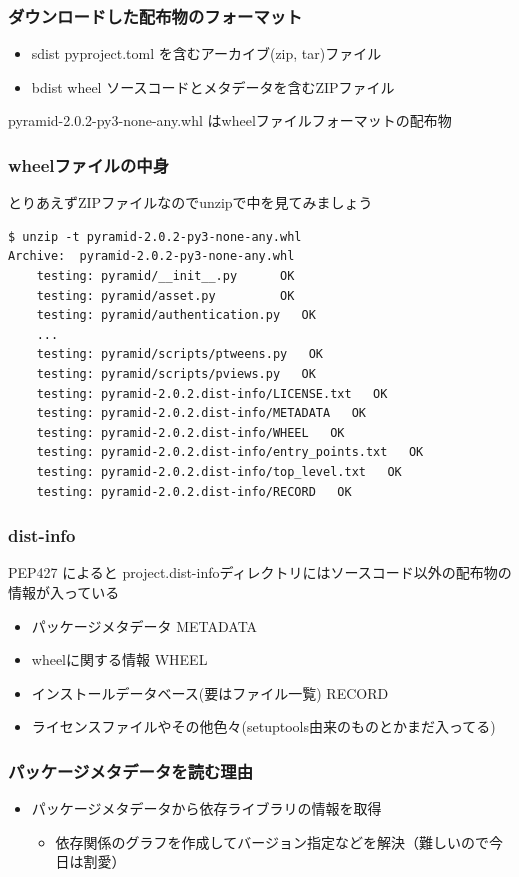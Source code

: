 \documentclass[aspectratio=169]{beamer}
\begin{document}
\begin{frame}
\frametitle{ダウンロードした配布物のフォーマット}
\begin{itemize}
\item sdist pyproject.toml を含むアーカイブ(zip, tar)ファイル
\item bdist wheel ソースコードとメタデータを含むZIPファイル
\end{itemize}

pyramid-2.0.2-py3-none-any.whl はwheelファイルフォーマットの配布物
\end{frame}

\begin{frame}[fragile]
\frametitle{wheelファイルの中身}
とりあえずZIPファイルなのでunzipで中を見てみましょう
\begin{lstlisting}
$ unzip -t pyramid-2.0.2-py3-none-any.whl
Archive:  pyramid-2.0.2-py3-none-any.whl
    testing: pyramid/__init__.py      OK
    testing: pyramid/asset.py         OK
    testing: pyramid/authentication.py   OK
	...
    testing: pyramid/scripts/ptweens.py   OK
    testing: pyramid/scripts/pviews.py   OK
    testing: pyramid-2.0.2.dist-info/LICENSE.txt   OK
    testing: pyramid-2.0.2.dist-info/METADATA   OK
    testing: pyramid-2.0.2.dist-info/WHEEL   OK
    testing: pyramid-2.0.2.dist-info/entry_points.txt   OK
    testing: pyramid-2.0.2.dist-info/top_level.txt   OK
    testing: pyramid-2.0.2.dist-info/RECORD   OK
\end{lstlisting}
\end{frame}

\begin{frame}
\frametitle{dist-info}
PEP427 によると {project}.dist-infoディレクトリにはソースコード以外の配布物の情報が入っている
\begin{itemize}
\item パッケージメタデータ METADATA
\item wheelに関する情報 WHEEL
\item インストールデータベース(要はファイル一覧) RECORD
\item ライセンスファイルやその他色々(setuptools由来のものとかまだ入ってる)
\end{itemize}
\end{frame}

\begin{frame}
\frametitle{パッケージメタデータを読む理由}
\begin{itemize}
\item パッケージメタデータから依存ライブラリの情報を取得
\begin{itemize}
\item 依存関係のグラフを作成してバージョン指定などを解決（難しいので今日は割愛）
\end{itemize}
\end{itemize}
\end{frame}
\end{document}
